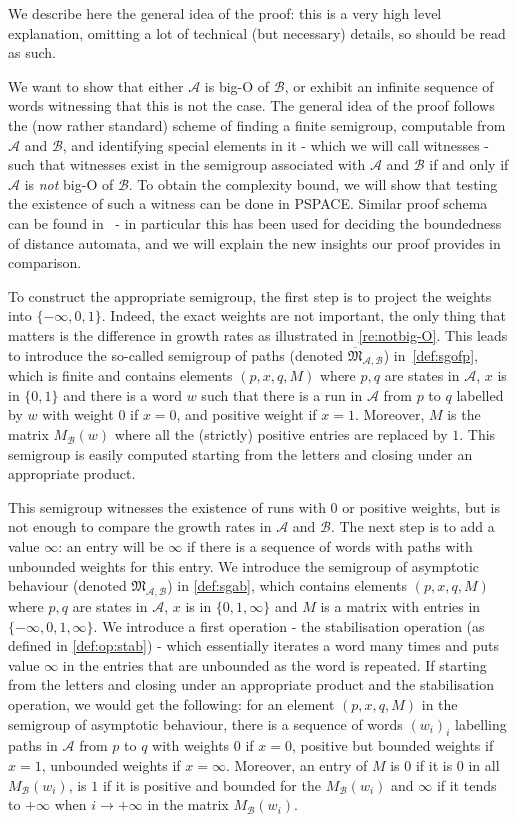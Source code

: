 \documentclass{lmcs}
\theoremstyle{remark}
\newcommand{\ideal}{\mathfrak{M}}
\newcommand{\autA}{\mathcal{A}}
\newcommand{\autB}{\mathcal{B}}
\theoremstyle{remark}
\begin{document}
We describe here the general idea of the proof: this is a very high level explanation, omitting a lot of technical (but necessary) details, so should be read as such.

We want to show that either $\autA$ is big-O of $\autB$, or exhibit an infinite sequence of words witnessing that this is not the case. The general idea of the proof follows the (now rather standard) scheme of finding a finite semigroup, computable from $\autA$ and $\autB$, and identifying special elements in it - which we will call witnesses - such that witnesses exist in the semigroup associated with $\autA$ and $\autB$ if and only if  $\autA$ is \emph{not} big-O of $\autB$.
To obtain the complexity bound, we will show that testing the existence of such a witness can be done in PSPACE.
Similar proof schema can be found in~\cite{Simon94,ColcombetD13,ColcombetDZ14} - in particular this has been used for deciding the boundedness of distance automata, and we will explain the new insights our proof provides in comparison.

To construct the appropriate semigroup, the first step is to project the weights into $\{-\infty, 0, 1\}$. Indeed, the exact weights are not important, the only thing that matters is the difference in growth rates as illustrated in \cref{re:notbig-O}. This leads to introduce the so-called semigroup of paths (denoted $\overline{\ideal}_{\autA,\autB}$) in~\cref{def:sgofp}, which is finite and contains elements $(p,x,q,M)$ where $p,q$ are states in $\autA$, $x$ is in $\{0, 1\}$ and there is a word $w$ such that there is a run in $\autA$ from $p$ to $q$ labelled by $w$ with weight $0$ if $x = 0$, and positive weight if $x =1$. Moreover, $M$ is the matrix $M_\autB(w)$ where all the (strictly) positive entries are replaced by $1$. This semigroup is easily computed starting from the letters and closing under an appropriate product.

This semigroup witnesses the existence of runs with $0$ or positive weights, but is not enough to compare the growth rates in $\autA$ and $\autB$. The next step is to add a value $\infty$: an entry will be $\infty$ if there is a sequence of words with paths with unbounded weights for this entry. We introduce the semigroup of asymptotic behaviour (denoted $\ideal_{\autA,\autB}$) in \cref{def:sgab}, which contains elements $(p,x,q,M)$ where $p,q$ are states in $\autA$, $x$ is in $\{0, 1, \infty\}$ and $M$ is a matrix with entries in $\{-\infty, 0, 1, \infty\}$. We introduce a first operation - the stabilisation operation (as defined in \cref{def:op:stab}) - which essentially iterates a word many times and puts value $\infty$ in the entries that are unbounded as the word is repeated. If starting from the letters and closing under an appropriate product and the stabilisation operation, we would get the following: for an element $(p,x,q,M)$ in the semigroup of asymptotic behaviour, there is a sequence of words $(w_i)_i$ labelling paths in $\autA$ from $p$ to $q$ with weights $0$ if $x=0$, positive but bounded weights if $x=1$, unbounded weights if $x=\infty$. Moreover, an entry of $M$ is $0$ if it is $0$ in all $M_\autB(w_i)$, is $1$ if it is positive and bounded for the $M_\autB(w_i)$ and $\infty$ if it tends to $+\infty$ when $i\to +\infty$ in the matrix $M_\autB(w_i)$.
\end{document}
